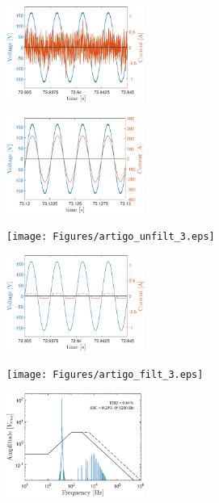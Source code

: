 \begin{figure}[!b] %
	\centering
	\includegraphics[width=0.4\textwidth]{Figures/artigo_filt_1.eps}
	\caption{}
	\label{fig:artigo_filt_1.eps}
\end{figure}

\begin{figure}[!b] %
	\centering
	\includegraphics[width=0.4\textwidth]{Figures/artigo_filt_2.eps}
	\caption{}
	\label{fig:artigo_filt_2.eps}
\end{figure}

\begin{figure}[!b] %
	\centering
	\texttt{[image: Figures/artigo\_unfilt\_3.eps]}
	\caption{}
	\label{fig:artigo_unfilt_3.eps}
\end{figure}

\begin{figure}[!b] %
	\centering
	\includegraphics[width=0.4\textwidth]{Figures/artigo_unfilt_4.eps}
	\caption{}
	\label{fig:artigo_unfilt_4.eps}
\end{figure}

\begin{figure}[!b] %
	\centering
	\texttt{[image: Figures/artigo\_filt\_3.eps]}
	\caption{}
	\label{fig:artigo_filt_3.eps}
\end{figure}

\begin{figure}[!b] %
	\centering
	\includegraphics[width=0.4\textwidth]{Figures/artigo_filt_4.eps}
	\caption{}
	\label{fig:artigo_filt_4.eps}
\end{figure}
